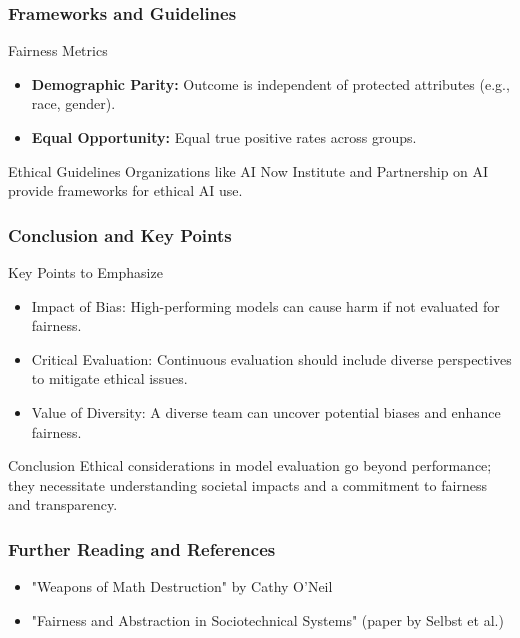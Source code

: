 \documentclass[aspectratio=169]{beamer}
\begin{document}
\begin{frame}[fragile]
    \frametitle{Frameworks and Guidelines}
    \begin{block}{Fairness Metrics}
        \begin{itemize}
            \item \textbf{Demographic Parity:} Outcome is independent of protected attributes (e.g., race, gender).
            \item \textbf{Equal Opportunity:} Equal true positive rates across groups.
        \end{itemize}
    \end{block}

    \begin{block}{Ethical Guidelines}
        Organizations like AI Now Institute and Partnership on AI provide frameworks for ethical AI use.
    \end{block}
\end{frame}

\begin{frame}[fragile]
    \frametitle{Conclusion and Key Points}
    \begin{block}{Key Points to Emphasize}
        \begin{itemize}
            \item Impact of Bias: High-performing models can cause harm if not evaluated for fairness.
            \item Critical Evaluation: Continuous evaluation should include diverse perspectives to mitigate ethical issues.
            \item Value of Diversity: A diverse team can uncover potential biases and enhance fairness.
        \end{itemize}
    \end{block}

    \begin{block}{Conclusion}
        Ethical considerations in model evaluation go beyond performance; they necessitate understanding societal impacts and a commitment to fairness and transparency.
    \end{block}
\end{frame}

\begin{frame}[fragile]
    \frametitle{Further Reading and References}
    \begin{itemize}
        \item "Weapons of Math Destruction" by Cathy O'Neil
        \item "Fairness and Abstraction in Sociotechnical Systems" (paper by Selbst et al.)
    \end{itemize}
\end{frame}
\end{document}
